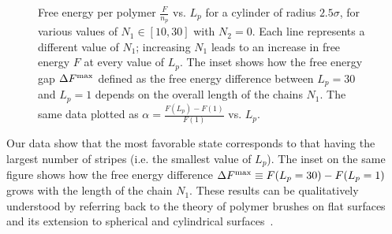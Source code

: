  \begin{figure}
	\begin{center}

	\end{center}
	\caption[Free energy and $\alpha$ as a function of $L_p$]{\protect{} Free energy per polymer $\frac{F}{n_p}$ vs. $L_p$ for a cylinder of radius $2.5\sigma$, for various values of $N_1 \in \left[10,30\right]$ with $N_2 = 0$.  Each line represents a different value of $N_1$; increasing $N_1$ leads to an increase in free energy $F$ at every value of $L_p$. The inset shows how the free energy gap $\Delta F^{\rm max}$ defined as the free energy difference between $L_p=30$ and  $L_p=1$
depends on the overall length of the chains $N_1$. \protect{} The same data plotted as $\alpha = \frac{F(L_p)-F(1)}{F(1)}$ vs. $L_p$.}
\end{figure}

Our data show that the most favorable state corresponds to that having the largest number of stripes (i.e. the smallest value of $L_p$). The inset on the same figure shows how the free energy difference $\Delta F^{\rm max}\equiv F(L_p=30)-F(L_p=1)$ grows with the length of the chain $N_1$.
 These results can be qualitatively understood by referring back to the theory of polymer brushes on flat surfaces and its extension to spherical and cylindrical  
surfaces~\cite{Cotton,LipowskyPB}. 

